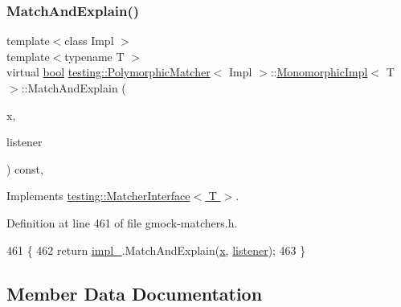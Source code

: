 \subsubsection{\texorpdfstring{Match\+And\+Explain()}{MatchAndExplain()}}
{\footnotesize\ttfamily template$<$class Impl $>$ \\
template$<$typename T $>$ \\
virtual \hyperlink{classbool}{bool} \hyperlink{classtesting_1_1PolymorphicMatcher}{testing\+::\+Polymorphic\+Matcher}$<$ Impl $>$\+::\hyperlink{classtesting_1_1PolymorphicMatcher_1_1MonomorphicImpl}{Monomorphic\+Impl}$<$ T $>$\+::Match\+And\+Explain (\begin{DoxyParamCaption}\item[{T}]{x,  }\item[{\hyperlink{classtesting_1_1MatchResultListener}{Match\+Result\+Listener} $\ast$}]{listener }\end{DoxyParamCaption}) const\hspace{0.3cm}{\ttfamily [inline]}, {\ttfamily [virtual]}}



Implements \hyperlink{classtesting_1_1MatcherInterface_a296b43607cd99d60365f0e6a762777cf}{testing\+::\+Matcher\+Interface$<$ T $>$}.



Definition at line 461 of file gmock-\/matchers.\+h.


\begin{DoxyCode}
461                                                                            \{
462       \textcolor{keywordflow}{return} \hyperlink{classtesting_1_1PolymorphicMatcher_1_1MonomorphicImpl_af444d0e547c2f5b0a5e553868c042330}{impl\_}.MatchAndExplain(\hyperlink{namespaceinteractive__marker_acda52804aef30b460a72fb21ee01d69d}{x}, \hyperlink{namespaceinteractive__marker_a0e579ab555212bb5e2c9f8a675b7618a}{listener});
463     \}
\end{DoxyCode}


\subsection{Member Data Documentation}
\mbox{\label{classtesting_1_1PolymorphicMatcher_1_1MonomorphicImpl_af444d0e547c2f5b0a5e553868c042330}} 
